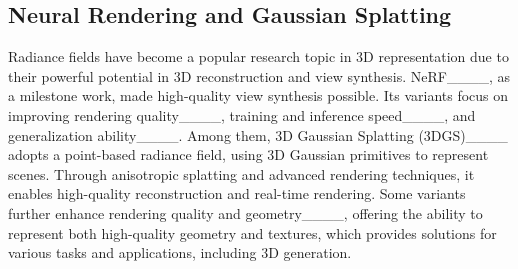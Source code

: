 \subsection{Neural Rendering and Gaussian Splatting}
Radiance fields have become a popular research topic in 3D representation due to their powerful potential in 3D reconstruction and view synthesis. NeRF____, as a milestone work, made high-quality view synthesis possible. Its variants focus on improving rendering quality____, training and inference speed____, and generalization ability____. Among them, 3D Gaussian Splatting (3DGS)____ adopts a point-based radiance field, using 3D Gaussian primitives to represent scenes. Through anisotropic splatting and advanced rendering techniques, it enables high-quality reconstruction and real-time rendering. Some variants further enhance rendering quality and geometry____, offering the ability to represent both high-quality geometry and textures, which provides solutions for various tasks and applications, including 3D generation.


